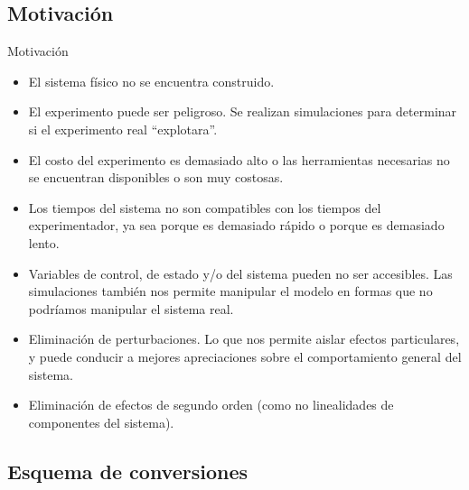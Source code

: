 \documentclass[10pt,handout]{beamer}
\newcommand{\quotes}[1]{``#1''}
\begin{document}
	\subsection{Motivación}
\begin{frame}{Motivación}
\begin{itemize}
	\item<1-> El sistema físico no se encuentra construido. 
	
	\item<2-> El experimento puede ser peligroso. Se realizan simulaciones para determinar si el experimento real \quotes{explotara}.

	\item<3-> El costo del experimento es demasiado alto o las herramientas necesarias no se encuentran disponibles o son muy costosas.

	\item<4-> Los tiempos del sistema no son compatibles con los tiempos del experimentador, ya sea porque es demasiado rápido o porque es demasiado lento.

	\item<5-> Variables de control, de estado y/o del sistema pueden no ser accesibles. Las simulaciones también nos permite manipular el modelo en formas que no podríamos manipular el sistema real.

	\item<6-> Eliminación de perturbaciones. Lo que nos permite aislar efectos particulares, y puede conducir a mejores apreciaciones sobre el comportamiento general del sistema.

	\item<7-> Eliminación de efectos de segundo orden (como no linealidades de componentes del sistema). 
\end{itemize}
\end{frame}

	\subsection{Esquema de conversiones}
\end{document}
